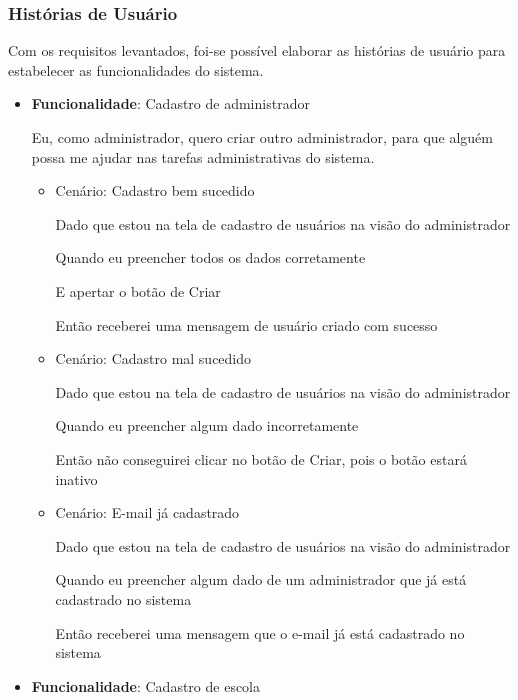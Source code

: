 \subsubsection{Histórias de Usuário}
Com os requisitos levantados, foi-se possível elaborar as histórias de usuário para estabelecer as funcionalidades do sistema. 

\begin{itemize}
    \item\textbf{Funcionalidade}: Cadastro de administrador
    
    Eu, como administrador, quero criar outro administrador, para que alguém possa me ajudar nas tarefas administrativas do sistema.
    \begin{itemize}
        \item Cenário: Cadastro bem sucedido  
        \par Dado que estou na tela de cadastro de usuários na visão do administrador
        \par Quando eu preencher todos os dados corretamente
        \par E apertar o botão de Criar
        \par Então receberei uma mensagem de usuário criado com sucesso
    \end{itemize}   
    \begin{itemize}
        \item Cenário: Cadastro mal sucedido  
        \par Dado que estou na tela de cadastro de usuários na visão do administrador
        \par Quando eu preencher algum dado incorretamente
        \par Então não conseguirei clicar no botão de Criar, pois o botão estará inativo
    \end{itemize}       
    \begin{itemize}
        \item Cenário: E-mail já cadastrado  
        \par Dado que estou na tela de cadastro de usuários na visão do administrador
        \par Quando eu preencher algum dado de um administrador que já está cadastrado no sistema
        \par Então receberei uma mensagem que o e-mail já está cadastrado no sistema
    \end{itemize}    

\item\textbf{Funcionalidade}: Cadastro de escola
    

\end{itemize}
